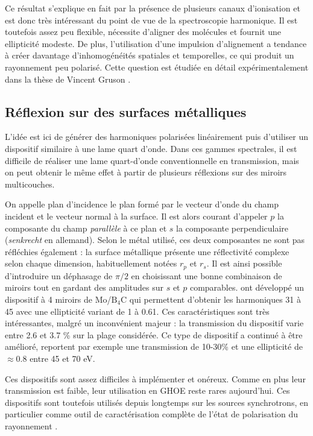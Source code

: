 Ce résultat s'explique en fait par la présence de plusieurs canaux d'ionisation et est donc très intéressant du point de vue de la spectroscopie harmonique. Il est toutefois assez peu flexible, nécessite d'aligner des molécules et fournit une ellipticité modeste. De plus, l'utilisation d'une impulsion d'alignement a tendance à créer davantage d'inhomogénéités spatiales et temporelles, ce qui produit un rayonnement peu polarisé. Cette question est étudiée en détail expérimentalement dans la thèse de Vincent Gruson .


\subsection{Réflexion sur des surfaces métalliques}
\label{sec:metalsurface}
L'idée est ici de générer des harmoniques polarisées linéairement puis d'utiliser un dispositif similaire à une lame quart d'onde. Dans ces gammes spectrales, il est difficile de réaliser une lame quart-d'onde conventionnelle en transmission, mais on peut obtenir le même effet à partir de plusieurs réflexions sur des miroirs multicouches. \par
On appelle plan d'incidence le plan formé par le vecteur d'onde du champ incident et le vecteur normal à la surface. Il est alors courant d'appeler $p$ la composante du champ \textit{parallèle} à ce plan et $s$ la composante perpendiculaire (\textit{senkrecht} en allemand). Selon le métal utilisé, ces deux composantes ne sont pas réfléchies également : la surface métallique présente une réflectivité complexe selon chaque dimension, habituellement notées $r_p$ et $r_s$. Il est ainsi possible d'introduire un déphasage de $\pi/2$ en choisissant une bonne combinaison de miroirs tout en gardant des amplitudes sur $s$ et $p$ comparables.  ont développé un dispositif à 4 miroirs de Mo/$\text{B}_\text{4}$C qui permettent d'obtenir les harmoniques 31 à 45 avec une ellipticité variant de 1 à 0.61. Ces caractéristiques sont très intéressantes, malgré un inconvénient majeur : la transmission du dispositif varie entre 2.6 et 3.7 \% sur la plage considérée. Ce type de dispositif a continué à être amélioré,  reportent par exemple une transmission de 10-30\% et une ellipticité de $\approx 0.8$ entre 45 et 70 eV.\par

Ces dispositifs sont assez difficiles à implémenter et onéreux. Comme en plus leur transmission est faible, leur utilisation en GHOE reste rares aujourd'hui. Ces dispositifs sont toutefois utilisés depuis longtemps sur les sources synchrotrons, en particulier comme outil de caractérisation complète de l'état de polarisation du rayonnement . 


